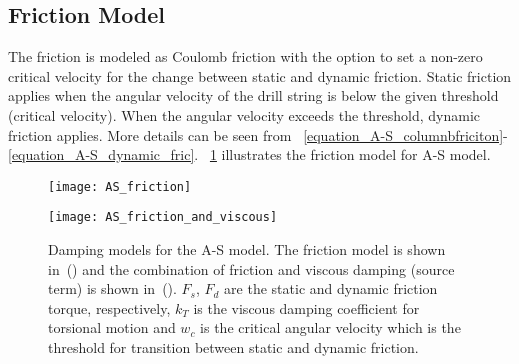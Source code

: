 \subsection{Friction Model}
\label{sec:asfrictionmodel}
The friction is modeled as Coulomb friction with the option to set a non-zero critical velocity for the change between static and dynamic friction.  Static friction applies when the angular velocity of the drill string is below the given threshold (critical velocity). When the angular velocity exceeds the threshold, dynamic friction applies. More details can be seen from \equationname~\ref{equation_A-S_columnbfriciton}-\ref{equation_A-S_dynamic_fric}. \figurename~\ref{figure_AS_damping} illustrates the friction model for A-S model.
\begin{figure}
	\begin{minipage}[t]{\linewidth}
			\begin{minipage}[t]{0.45\linewidth}
				\centering
				\texttt{[image: AS\_friction]}
				\label{fig:asfriction}
			\end{minipage}
			\hfill
			\begin{minipage}[t]{0.45\linewidth}
				\centering
				\texttt{[image: AS\_friction\_and\_viscous]}
				\label{fig:asfrictionandviscous}
			\end{minipage}
	\end{minipage}
	\caption[Damping models for the A-S model]{Damping models for the A-S model. The friction model is shown in~() and the combination of friction and viscous damping (source term) is shown in~(). $F_{s}$, $F_{d}$ are the static and dynamic friction torque, respectively, $k_{T}$ is the viscous damping coefficient for torsional motion and $w_{c}$ is the critical angular velocity which is the threshold for transition between static and dynamic friction.}\label{figure_AS_damping}
\end{figure}

